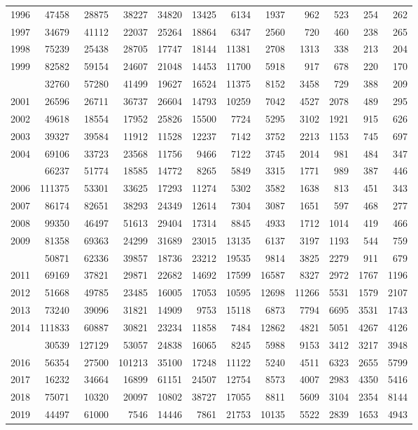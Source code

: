 \documentclass[
]{article}
\begin{document}
\begin{longtable}[t]{lrrrrrrrrrrr}
1996 & 47458 & 28875 & 38227 & 34820 & 13425 & 6134 & 1937 & 962 & 523 & 254 & 262\\
1997 & 34679 & 41112 & 22037 & 25264 & 18864 & 6347 & 2560 & 720 & 460 & 238 & 265\\
1998 & 75239 & 25438 & 28705 & 17747 & 18144 & 11381 & 2708 & 1313 & 338 & 213 & 204\\
1999 & 82582 & 59154 & 24607 & 21048 & 14453 & 11700 & 5918 & 917 & 678 & 220 & 170\\
\addlinespace
2000 & 32760 & 57280 & 41499 & 19627 & 16524 & 11375 & 8152 & 3458 & 729 & 388 & 209\\
2001 & 26596 & 26711 & 36737 & 26604 & 14793 & 10259 & 7042 & 4527 & 2078 & 489 & 295\\
2002 & 49618 & 18554 & 17952 & 25826 & 15500 & 7724 & 5295 & 3102 & 1921 & 915 & 626\\
2003 & 39327 & 39584 & 11912 & 11528 & 12237 & 7142 & 3752 & 2213 & 1153 & 745 & 697\\
2004 & 69106 & 33723 & 23568 & 11756 & 9466 & 7122 & 3745 & 2014 & 981 & 484 & 347\\
\addlinespace
2005 & 66237 & 51774 & 18585 & 14772 & 8265 & 5849 & 3315 & 1771 & 989 & 387 & 446\\
2006 & 111375 & 53301 & 33625 & 17293 & 11274 & 5302 & 3582 & 1638 & 813 & 451 & 343\\
2007 & 86174 & 82651 & 38293 & 24349 & 12614 & 7304 & 3087 & 1651 & 597 & 468 & 277\\
2008 & 99350 & 46497 & 51613 & 29404 & 17314 & 8845 & 4933 & 1712 & 1014 & 419 & 466\\
2009 & 81358 & 69363 & 24299 & 31689 & 23015 & 13135 & 6137 & 3197 & 1193 & 544 & 759\\
\addlinespace
2010 & 50871 & 62336 & 39857 & 18736 & 23212 & 19535 & 9814 & 3825 & 2279 & 911 & 679\\
2011 & 69169 & 37821 & 29871 & 22682 & 14692 & 17599 & 16587 & 8327 & 2972 & 1767 & 1196\\
2012 & 51668 & 49785 & 23485 & 16005 & 17053 & 10595 & 12698 & 11266 & 5531 & 1579 & 2107\\
2013 & 73240 & 39096 & 31821 & 14909 & 9753 & 15118 & 6873 & 7794 & 6695 & 3531 & 1743\\
2014 & 111833 & 60887 & 30821 & 23234 & 11858 & 7484 & 12862 & 4821 & 5051 & 4267 & 4126\\
\addlinespace
2015 & 30539 & 127129 & 53057 & 24838 & 16065 & 8245 & 5988 & 9153 & 3412 & 3217 & 3948\\
2016 & 56354 & 27500 & 101213 & 35100 & 17248 & 11122 & 5240 & 4511 & 6323 & 2655 & 5799\\
2017 & 16232 & 34664 & 16899 & 61151 & 24507 & 12754 & 8573 & 4007 & 2983 & 4350 & 5416\\
2018 & 75071 & 10320 & 20097 & 10802 & 38727 & 17055 & 8811 & 5609 & 3104 & 2354 & 8144\\
2019 & 44497 & 61000 & 7546 & 14446 & 7861 & 21753 & 10135 & 5522 & 2839 & 1653 & 4943\\*
\end{longtable}
\end{document}
